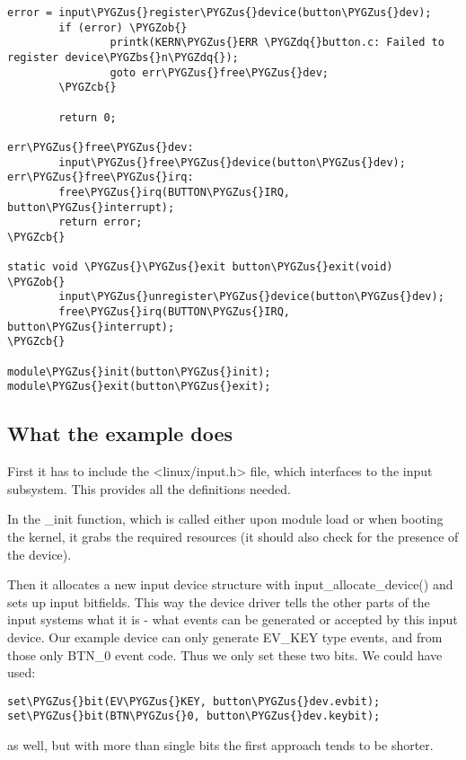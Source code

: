 \documentclass[a4paper,8pt,english]{sphinxmanual}
\def\PYGZbs{\char`\\}
\def\PYGZus{\char`\_}
\def\PYGZob{\char`\{}
\def\PYGZcb{\char`\}}
\def\PYGZdq{\char`\"}
\begin{document}
\begin{Verbatim}[commandchars=\\\{\}]
        error = input\PYGZus{}register\PYGZus{}device(button\PYGZus{}dev);
        if (error) \PYGZob{}
                printk(KERN\PYGZus{}ERR \PYGZdq{}button.c: Failed to register device\PYGZbs{}n\PYGZdq{});
                goto err\PYGZus{}free\PYGZus{}dev;
        \PYGZcb{}

        return 0;

err\PYGZus{}free\PYGZus{}dev:
        input\PYGZus{}free\PYGZus{}device(button\PYGZus{}dev);
err\PYGZus{}free\PYGZus{}irq:
        free\PYGZus{}irq(BUTTON\PYGZus{}IRQ, button\PYGZus{}interrupt);
        return error;
\PYGZcb{}

static void \PYGZus{}\PYGZus{}exit button\PYGZus{}exit(void)
\PYGZob{}
        input\PYGZus{}unregister\PYGZus{}device(button\PYGZus{}dev);
        free\PYGZus{}irq(BUTTON\PYGZus{}IRQ, button\PYGZus{}interrupt);
\PYGZcb{}

module\PYGZus{}init(button\PYGZus{}init);
module\PYGZus{}exit(button\PYGZus{}exit);
\end{Verbatim}


\subsection{What the example does}
\label{input/input-programming:what-the-example-does}
First it has to include the \textless{}linux/input.h\textgreater{} file, which interfaces to the
input subsystem. This provides all the definitions needed.

In the \_init function, which is called either upon module load or when
booting the kernel, it grabs the required resources (it should also check
for the presence of the device).

Then it allocates a new input device structure with input\_allocate\_device()
and sets up input bitfields. This way the device driver tells the other
parts of the input systems what it is - what events can be generated or
accepted by this input device. Our example device can only generate EV\_KEY
type events, and from those only BTN\_0 event code. Thus we only set these
two bits. We could have used:

\begin{Verbatim}[commandchars=\\\{\}]
set\PYGZus{}bit(EV\PYGZus{}KEY, button\PYGZus{}dev.evbit);
set\PYGZus{}bit(BTN\PYGZus{}0, button\PYGZus{}dev.keybit);
\end{Verbatim}

as well, but with more than single bits the first approach tends to be
shorter.
\end{document}
